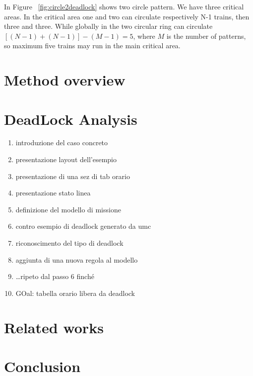 \documentclass{ewic}
\begin{document}

In Figure ~\ref{fig:circle2deadlock} shows two circle pattern. We have three critical areas. In the critical area one and two can circulate respectively N-1 trains, then three and three. While globally in the two circular ring can circulate $[(N-1) + (N-1)] - (M-1)=5$, where $M$ is the number of patterns, so maximum five trains may run in the main critical area.

\section{Method overview}


\section{DeadLock Analysis}
\begin{enumerate}
\item introduzione del caso concreto
\item presentazione layout dell'esempio
\item presentazione di una sez di tab orario
\item presentazione stato linea
\item definizione del modello di missione
\item contro esempio di deadlock generato da umc
\item riconoscimento del tipo di deadlock
\item aggiunta di una nuova regola al modello
\item \ldots ripeto dal passo 6 finch\'{e}
\item GOal: tabella orario libera da deadlock
\end{enumerate}
%

\section{Related works}
%
\section{Conclusion}
%
\end{document}
